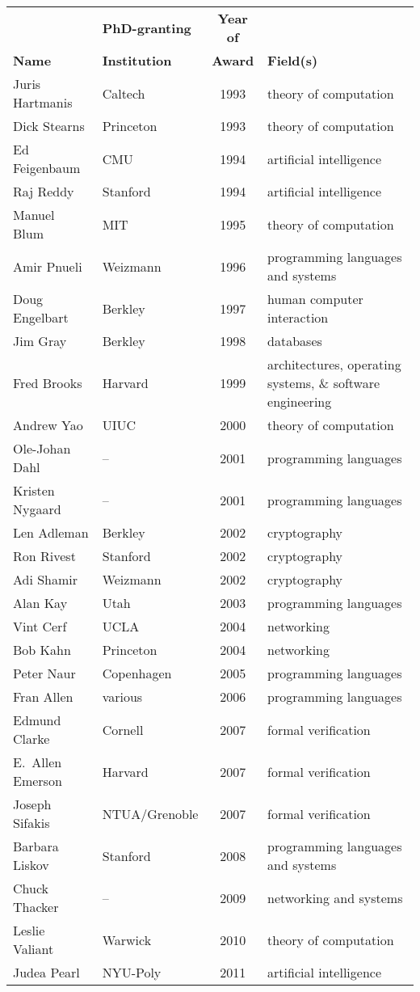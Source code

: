 \documentclass[doublespacing]{utdthesis}
\begin{document}
\begin{table}[t]
\contcaption
\begin{center}
\begin{tabular}{llcp{2.5in}} \hline
& \textbf{PhD-granting} & \textbf{Year of} & \\
\textbf{Name} & \textbf{Institution} & \textbf{Award} & \textbf{Field(s)}
  \\ \hline
Juris Hartmanis & Caltech & 1993 & theory of computation \\
Dick Stearns & Princeton & 1993 & theory of computation \\
Ed Feigenbaum & CMU & 1994 & artificial intelligence \\
Raj Reddy & Stanford & 1994 & artificial intelligence \\
Manuel Blum & MIT & 1995 & theory of computation \\
Amir Pnueli & Weizmann & 1996 & programming languages and systems \\
Doug Engelbart & Berkley & 1997 & human computer interaction \\
Jim Gray & Berkley & 1998 & databases \\
Fred Brooks & Harvard & 1999 & architectures, operating systems,
  \& software engineering \\
Andrew Yao & UIUC & 2000 & theory of computation \\
Ole-Johan Dahl & -- & 2001 & programming languages \\
Kristen Nygaard & -- & 2001 & programming languages \\
Len Adleman & Berkley & 2002 & cryptography \\
Ron Rivest & Stanford & 2002 & cryptography \\
Adi Shamir & Weizmann & 2002 & cryptography \\
Alan Kay & Utah & 2003 & programming languages \\
Vint Cerf & UCLA & 2004 & networking \\
Bob Kahn & Princeton & 2004 & networking \\
Peter Naur & Copenhagen & 2005 & programming languages \\
Fran Allen & various & 2006 & programming languages \\
Edmund Clarke & Cornell & 2007 & formal verification \\
E.~Allen Emerson & Harvard & 2007 & formal verification \\
Joseph Sifakis & NTUA/Grenoble & 2007 & formal verification \\
Barbara Liskov & Stanford & 2008 & programming languages and systems \\
Chuck Thacker & -- & 2009 & networking and systems \\
Leslie Valiant & Warwick & 2010 & theory of computation \\
Judea Pearl & NYU-Poly & 2011 & artificial intelligence \\
\hline
\end{tabular}
\end{center}
\end{table}
\end{document}
